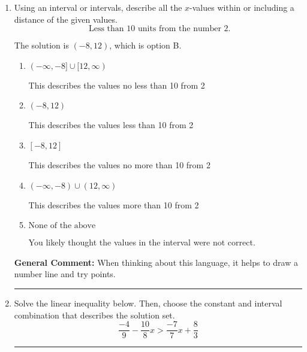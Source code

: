 \documentclass{extbook}[14pt]
\newcommand{\litem}[1]{\item #1

\rule{\textwidth}{0.4pt}}
\begin{document}
\begin{enumerate}
{The solution is \( (-\infty, -6] \cup [-2, \infty) \), which is option B.\begin{enumerate}[label=\Alph*.]
\item \( (-\infty, -6) \cup (-2, \infty) \)

This describes the values more than 2 from -4
\item \( (-\infty, -6] \cup [-2, \infty) \)

This describes the values no less than 2 from -4
\item \( [-6, -2] \)

This describes the values no more than 2 from -4
\item \( (-6, -2) \)

This describes the values less than 2 from -4
\item \( \text{None of the above} \)

You likely thought the values in the interval were not correct.
\end{enumerate}

\textbf{General Comment:} When thinking about this language, it helps to draw a number line and try points.
}
\litem{
Using an interval or intervals, describe all the $x$-values within or including a distance of the given values.
\[ \text{ Less than } 10 \text{ units from the number } 2. \]

The solution is \( (-8, 12) \), which is option B.\begin{enumerate}[label=\Alph*.]
\item \( (-\infty, -8] \cup [12, \infty) \)

This describes the values no less than 10 from 2
\item \( (-8, 12) \)

This describes the values less than 10 from 2
\item \( [-8, 12] \)

This describes the values no more than 10 from 2
\item \( (-\infty, -8) \cup (12, \infty) \)

This describes the values more than 10 from 2
\item \( \text{None of the above} \)

You likely thought the values in the interval were not correct.
\end{enumerate}

\textbf{General Comment:} When thinking about this language, it helps to draw a number line and try points.
}
\litem{
Solve the linear inequality below. Then, choose the constant and interval combination that describes the solution set.
\[ \frac{-4}{9} - \frac{10}{8} x > \frac{-7}{7} x + \frac{8}{3} \]

}
\end{enumerate}
\end{document}
